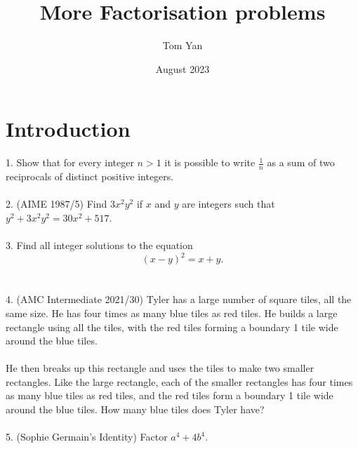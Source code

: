 \documentclass{article}
\title{More Factorisation problems}
\author{Tom Yan}
\date{August 2023}
\begin{document}
\maketitle

\section{Introduction}
1. Show that for every integer $n>1$ it is possible to write $\frac{1}{n}$ as a sum of two reciprocals of distinct positive integers.  \\\\
2. (AIME 1987/5) Find $3x^2 y^2$ if $x$ and $y$ are integers such that $y^2 + 3x^2 y^2 = 30x^2 + 517$. \\\\
3. Find all integer solutions to the equation $$(x-y)^2=x+y.$$\\\\
4. (AMC Intermediate 2021/30) Tyler has a large number of square tiles, all the same size. He has four times as many blue tiles as red tiles. He builds a large rectangle using all the tiles, with the red tiles forming a boundary 1 tile wide around the blue tiles. \\\\  He then breaks up this rectangle and uses the tiles to make two smaller rectangles. Like the large rectangle, each of the smaller rectangles has four times as many blue tiles as red tiles, and the red tiles form a boundary 1 tile wide around the blue tiles. How many blue tiles does Tyler have? \\\\
5. (Sophie Germain's Identity) Factor $a^4+4b^4$.
\end{document}
